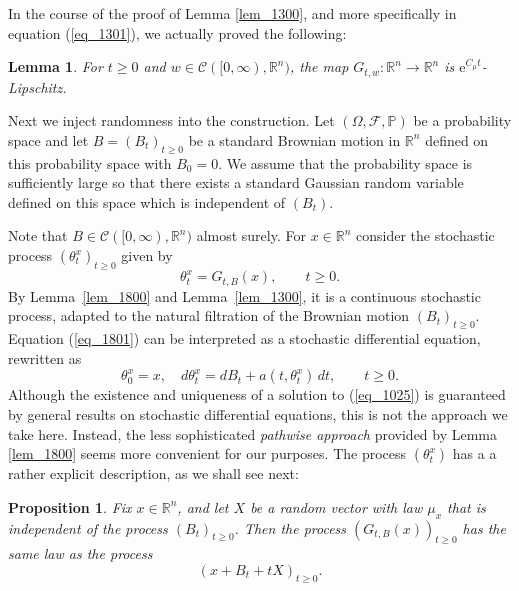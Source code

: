 \documentclass[12pt,a4paper]{article}
\newcommand{\prob}{\mathbb{P}}
\newcommand{\e}{\mathrm{e}}
\newcommand{\RR}{\mathbb{R}}
\newcommand{\R}{\mathbb{R}}
\newcommand{\cC}{\mathcal C}
\newtheorem{lemma}[theorem]{Lemma}
\newtheorem{proposition}[theorem]{Proposition}
\theoremstyle{definition}
\begin{document}
In the course of the proof of Lemma \ref{lem_1300},
and more specifically in 
equation (\ref{eq_1301}), we actually proved the following:
%
\begin{lemma}\label{lem_1400}
For  $t\geq0$ and  $w\in \mathcal C ([0,\infty), \R^n)$, the map
$G_{t,w}: \RR^n \rightarrow \RR^n$ is $\e^{C_\mu t}$-Lipschitz.
\end{lemma}
%
Next we inject randomness into the construction. 
Let $(\Omega,\mathcal F,\prob)$ be a probability space
and let $B = (B_t)_{t \geq 0}$ be a standard Brownian motion in $\RR^n$ defined
on this probability space with $B_0 = 0$. We assume that the probability space 
is sufficiently large so that there exists a standard Gaussian random variable 
defined on this space which is independent of $(B_t)$. 

\medskip Note that $B \in \cC([0, \infty), \RR^n)$ almost surely. For $x\in \R^n$ consider the stochastic process
$(\theta_t^x)_{t \geq 0}$ given by $$ \theta_t^x = G_{t,B} (x), \qquad t \geq 0. $$
By Lemma~\ref{lem_1800} and Lemma~\ref{lem_1300}, it is a continuous stochastic process,
adapted to the natural filtration of the Brownian motion $(B_t)_{t \geq 0}$.
Equation (\ref{eq_1801}) can be interpreted as a stochastic
differential equation, rewritten as
\begin{equation} 
\theta_0^x =x , \quad d \theta_t^x = d B_t + a(t,\theta_t^x) \, dt, \qquad t \geq 0.
\label{eq_1025} \end{equation}
Although the existence and uniqueness of a solution to (\ref{eq_1025}) is
guaranteed by general results on stochastic differential
equations, this is not the approach we take here. Instead, the less
sophisticated \emph{pathwise approach} provided
by Lemma \ref{lem_1800} seems more convenient for
our purposes. The process $(\theta_t^x)$ has a
a rather explicit description, as we shall see next:
%
\begin{proposition}
\label{prop_1824}
Fix $x \in \RR^n$, and let $X$ be a random vector with law $\mu_{x}$ that is independent of the process $(B_t)_{t \geq 0}$.
Then the process $(G_{t,B} (x))_{t\geq 0}$
has the same law as the process
\begin{equation}
( x+ B_t + t X)_{t\geq 0} .
\label{eq_1929}
\end{equation}
\end{proposition}
\end{document}

